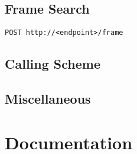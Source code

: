 \subsection{Frame Search}
\hfill
\texttt{POST http://<endpoint>/frame}

\subsection{Calling Scheme}

\subsection{Miscellaneous}

\section{Documentation}

